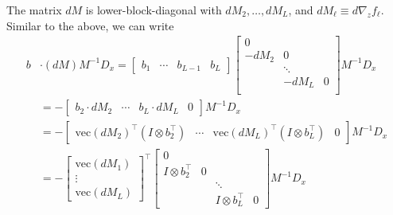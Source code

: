 \documentclass{article}
\begin{document}
The matrix $dM$ is lower-block-diagonal with $dM_2,\ldots, dM_L$, and $dM_\ell
    \equiv d \nabla_z f_\ell$. Similar to the above, we can write
\begin{align}
    b & \cdot (dM) M^{-1} D_x =
    \begin{bmatrix}
        b_1 & \cdots & b_{L-1} & b_L
    \end{bmatrix}
    \begin{bmatrix}
        0                  \\
        -dM_2 & 0          \\
              & \ddots     \\
              & -dM_L  & 0 \\
    \end{bmatrix}
    M^{-1} D_x                                                                   \\
      & = -\begin{bmatrix}
               b_2 \cdot dM_2 & \cdots & b_L \cdot dM_L & 0
           \end{bmatrix}
    M^{-1} D_x                                                                   \\
      & = -\begin{bmatrix}
               \mathrm{vec} \left(dM_2\right)^\top \left(I \otimes b_2^\top\right) &
               \cdots                                                              &
               \mathrm{vec} \left(dM_L\right)^\top \left(I \otimes b_L^\top\right) &
               0
           \end{bmatrix}
    M^{-1} D_x                                                                   \\
      & =
    -\begin{bmatrix}
         \mathrm{vec} \left(dM_1\right) \\
         \vdots                         \\
         \mathrm{vec} \left(dM_L\right)
     \end{bmatrix}
    ^\top
    \begin{bmatrix}
        0                                               \\
        I \otimes b_2^\top & 0                          \\
                           &   & \ddots                 \\
                           &   & I \otimes b_L^\top & 0
    \end{bmatrix}
    M^{-1} D_x                                                                   \\

\end{align}
\end{document}
